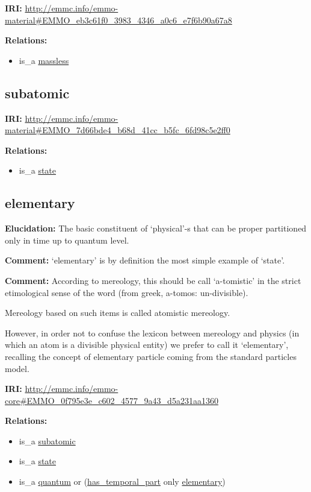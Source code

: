 \documentclass[a4paper,]{report}
\providecommand{\tightlist}{%
  \setlength{\itemsep}{0pt}\setlength{\parskip}{0pt}}
\begin{document}
\textbf{IRI:}
\url{http://emmc.info/emmo-material\#EMMO_eb3c61f0_3983_4346_a0c6_e7f6b90a67a8}

\textbf{Relations:}

\begin{itemize}
\tightlist
\item
  is\_a \protect\hyperlink{massless}{massless}
\end{itemize}

\hypertarget{subatomic}{%
\subsection{subatomic}\label{subatomic}}

\textbf{IRI:}
\url{http://emmc.info/emmo-material\#EMMO_7d66bde4_b68d_41cc_b5fc_6fd98c5e2ff0}

\textbf{Relations:}

\begin{itemize}
\tightlist
\item
  is\_a \protect\hyperlink{state}{state}
\end{itemize}

\hypertarget{elementary-1}{%
\subsection{elementary}\label{elementary-1}}

\textbf{Elucidation:} The basic constituent of `physical'-s that can be
proper partitioned only in time up to quantum level.

\textbf{Comment:} `elementary' is by definition the most simple example
of `state'.

\textbf{Comment:} According to mereology, this should be call
`a-tomistic' in the strict etimological sense of the word (from greek,
a-tomos: un-divisible).

Mereology based on such items is called atomistic mereology.

However, in order not to confuse the lexicon between mereology and
physics (in which an atom is a divisible physical entity) we prefer to
call it `elementary', recalling the concept of elementary particle
coming from the standard particles model.

\textbf{IRI:}
\url{http://emmc.info/emmo-core\#EMMO_0f795e3e_c602_4577_9a43_d5a231aa1360}

\textbf{Relations:}

\begin{itemize}
\tightlist
\item
  is\_a \protect\hyperlink{subatomic}{subatomic}
\item
  is\_a \protect\hyperlink{state}{state}
\item
  is\_a \protect\hyperlink{quantum}{quantum} or
  (\protect\hyperlink{has_temporal_part}{has\_temporal\_part} only
  \protect\hyperlink{elementary}{elementary})
\end{itemize}
\end{document}
